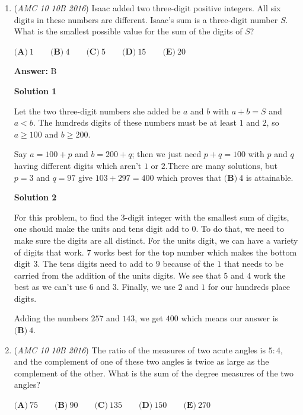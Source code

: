 \begin{enumerate}
	\item (\textit{AMC 10 10B 2016}) Isaac added two three-digit positive integers. All six digits in these numbers are different. Isaac's sum is a three-digit number $S$. What is the smallest possible value for the sum of the digits of $S$?


 $\textbf{(A)}\ 1\qquad\textbf{(B)}\ 4\qquad\textbf{(C)}\ 5\qquad\textbf{(D)}\ 15\qquad\textbf{(E)}\ 20$

 \textbf{Answer: }B



\textbf{Solution 1}

Let the two three-digit numbers she added be $a$ and $b$ with $a+b=S$ and $a<b$. The hundreds digits of these numbers must be at least $1$ and $2$, so $a\ge 100$ and $b\ge 200$.

 Say $a=100+p$ and $b=200+q$; then we just need $p+q=100$ with $p$ and $q$ having different digits which aren't $1$ or $2$.There are many solutions, but $p=3$ and $q=97$ give $103+297=400$ which proves that $\boxed{\textbf{(B)}\ 4}$ is attainable.

 



\textbf{Solution 2}

For this problem, to find the $3$-digit integer with the smallest sum of digits, one should make the units and tens digit add to $0$. To do that, we need to make sure the digits are all distinct. For the units digit, we can have a variety of digits that work. $7$ works best for the top number which makes the bottom digit $3$. The tens digits need to add to $9$ because of the $1$ that needs to be carried from the addition of the units digits. We see that $5$ and $4$ work the best as we can't use $6$ and $3$. Finally, we use $2$ and $1$ for our hundreds place digits.

 Adding the numbers $257$ and $143$, we get $400$ which means our answer is $\boxed{\textbf{(B)}\ 4}$.

 


 


	\item (\textit{AMC 10 10B 2016}) The ratio of the measures of two acute angles is $5:4$, and the complement of one of these two angles is twice as large as the complement of the other. What is the sum of the degree measures of the two angles?


 $\textbf{(A)}\ 75\qquad\textbf{(B)}\ 90\qquad\textbf{(C)}\ 135\qquad\textbf{(D)}\ 150\qquad\textbf{(E)}\ 270$


\end{enumerate}
